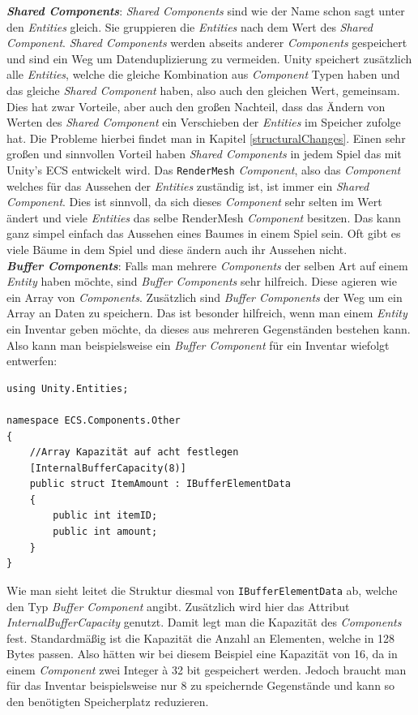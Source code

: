 \textbf{\textit{Shared Components}}: \textit{Shared Components} sind wie der Name schon sagt unter den \textit{Entities} gleich. Sie gruppieren die \textit{Entities} nach dem Wert des \textit{Shared Component}. \textit{Shared Components} werden abseits anderer \textit{Components} gespeichert und sind ein Weg um Datenduplizierung zu vermeiden. Unity speichert zusätzlich alle \textit{Entities}, welche die gleiche Kombination aus \textit{Component} Typen haben und das gleiche \textit{Shared Component} haben, also auch den gleichen Wert, gemeinsam. Dies hat zwar Vorteile, aber auch den großen Nachteil, dass das Ändern von Werten des \textit{Shared Component} ein Verschieben der \textit{Entities} im Speicher zufolge hat. Die Probleme hierbei findet man in Kapitel \ref{structuralChanges}. Einen sehr großen und sinnvollen Vorteil haben \textit{Shared Components} in jedem Spiel das mit Unity's ECS entwickelt wird. Das \texttt{RenderMesh} \textit{Component}, also das \textit{Component} welches für das Aussehen der \textit{Entities} zuständig ist, ist immer ein \textit{Shared Component}. Dies ist sinnvoll, da sich dieses \textit{Component} sehr selten im Wert ändert und viele \textit{Entities} das selbe RenderMesh \textit{Component} besitzen. Das kann ganz simpel einfach das Aussehen eines Baumes in einem Spiel sein. Oft gibt es viele Bäume in dem Spiel und diese ändern auch ihr Aussehen nicht.\\
\textbf{\textit{Buffer Components}}: Falls man mehrere \textit{Components} der selben Art auf einem \textit{Entity} haben möchte, sind \textit{Buffer Components} sehr hilfreich. Diese agieren wie ein Array von \textit{Components}. Zusätzlich sind \textit{Buffer Components} der Weg um ein Array an Daten zu speichern. Das ist besonder hilfreich, wenn man einem \textit{Entity} ein Inventar geben möchte, da dieses aus mehreren Gegenständen bestehen kann. Also kann man beispielsweise ein \textit{Buffer Component} für ein Inventar wiefolgt entwerfen:
\begin{lstlisting}[style=code, caption={Buffer \textit{Component} Beispiel}]
using Unity.Entities;

namespace ECS.Components.Other
{
	//Array Kapazität auf acht festlegen
    [InternalBufferCapacity(8)]
    public struct ItemAmount : IBufferElementData
    {
        public int itemID;
        public int amount;
    }
}
\end{lstlisting}
Wie man sieht leitet die Struktur diesmal von \texttt{IBufferElementData} ab, welche den Typ \textit{Buffer Component} angibt. Zusätzlich wird hier das Attribut \textit{InternalBufferCapacity} genutzt. Damit legt man die Kapazität des \textit{Components} fest. Standardmäßig ist die Kapazität die Anzahl an Elementen, welche in 128 Bytes passen. Also hätten wir bei diesem Beispiel eine Kapazität von 16, da in einem \textit{Component} zwei Integer à 32 bit gespeichert werden. Jedoch braucht man für das Inventar beispielsweise nur 8 zu speichernde Gegenstände und kann so den benötigten Speicherplatz reduzieren.
